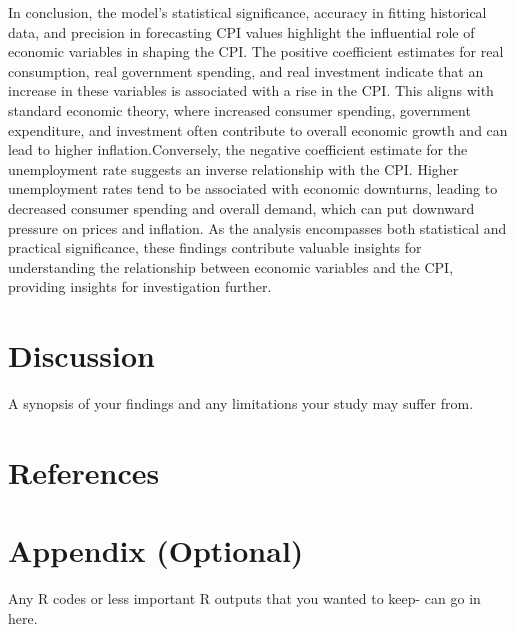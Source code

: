 \documentclass[
  man,floatsintext,
  man]{apa6}
\begin{document}
In conclusion, the model's statistical significance, accuracy in fitting historical data, and precision in forecasting CPI values highlight the influential role of economic variables in shaping the CPI. The positive coefficient estimates for real consumption, real government spending, and real investment indicate that an increase in these variables is associated with a rise in the CPI. This aligns with standard economic theory, where increased consumer spending, government expenditure, and investment often contribute to overall economic growth and can lead to higher inflation.Conversely, the negative coefficient estimate for the unemployment rate suggests an inverse relationship with the CPI. Higher unemployment rates tend to be associated with economic downturns, leading to decreased consumer spending and overall demand, which can put downward pressure on prices and inflation. As the analysis encompasses both statistical and practical significance, these findings contribute valuable insights for understanding the relationship between economic variables and the CPI, providing insights for investigation further.

\hypertarget{discussion}{%
\section{Discussion}\label{discussion}}

A synopsis of your findings and any limitations your study may suffer from.

\newpage

\hypertarget{references}{%
\section{References}\label{references}}

\hypertarget{appendix-optional}{%
\section{Appendix (Optional)}\label{appendix-optional}}

Any R codes or less important R outputs that you wanted to keep- can go in here.


\printbibliography
\end{document}
